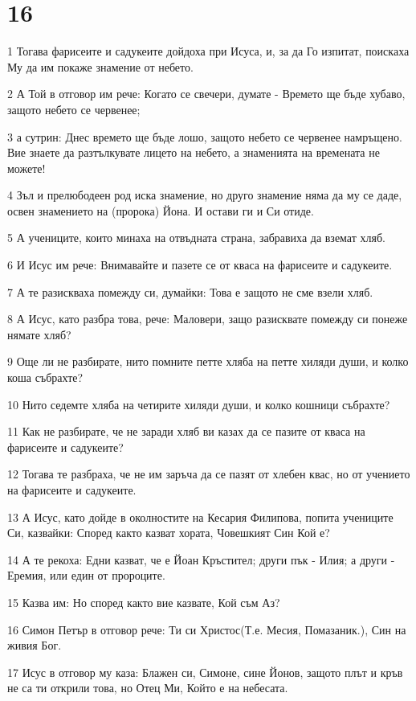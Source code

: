 \chapter{16}

\par 1 Тогава фарисеите и садукеите дойдоха при Исуса, и, за да Го изпитат, поискаха Му да им покаже знамение от небето.
\par 2 А Той в отговор им рече: Когато се свечери, думате - Времето ще бъде хубаво, защото небето се червенее;
\par 3 а сутрин: Днес времето ще бъде лошо, защото небето се червенее намръщено. Вие знаете да разтълкувате лицето на небето, а знаменията на времената не можете!
\par 4 Зъл и прелюбодеен род иска знамение, но друго знамение няма да му се даде, освен знамението на (пророка) Йона. И остави ги и Си отиде.
\par 5 А учениците, които минаха на отвъдната страна, забравиха да вземат хляб.
\par 6 И Исус им рече: Внимавайте и пазете се от кваса на фарисеите и садукеите.
\par 7 А те разискваха помежду си, думайки: Това е защото не сме взели хляб.
\par 8 А Исус, като разбра това, рече: Маловери, защо разисквате помежду си понеже нямате хляб?
\par 9 Още ли не разбирате, нито помните петте хляба на петте хиляди души, и колко коша събрахте?
\par 10 Нито седемте хляба на четирите хиляди души, и колко кошници събрахте?
\par 11 Как не разбирате, че не заради хляб ви казах да се пазите от кваса на фарисеите и садукеите?
\par 12 Тогава те разбраха, че не им заръча да се пазят от хлебен квас, но от учението на фарисеите и садукеите.
\par 13 А Исус, като дойде в околностите на Кесария Филипова, попита учениците Си, казвайки: Според както казват хората, Човешкият Син Кой е?
\par 14 А те рекоха: Едни казват, че е Йоан Кръстител; други пък - Илия; а други - Еремия, или един от пророците.
\par 15 Казва им: Но според както вие казвате, Кой съм Аз?
\par 16 Симон Петър в отговор рече: Ти си Христос(Т.е. Месия, Помазаник.), Син на живия Бог.
\par 17 Исус в отговор му каза: Блажен си, Симоне, сине Йонов, защото плът и кръв не са ти открили това, но Отец Ми, Който е на небесата.

